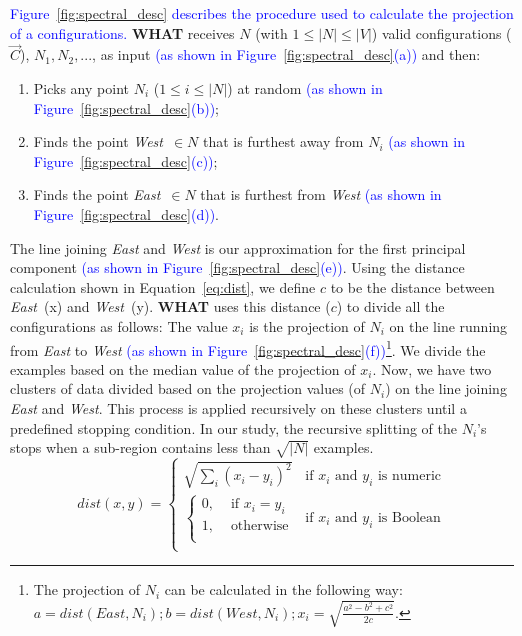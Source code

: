 \documentclass[smallextended]{svjour3}       %
\newcommand{\what}{{\bf WHAT}\xspace}
\begin{document}
\textcolor{blue}{Figure~\ref{fig:spectral_desc} describes the procedure used to calculate the projection of a configurations.} \what receives $N$ (with $1\leq \left\vert{N}\right\vert\leq \left\vert{V}\right\vert$)
valid configurations ($\vec{C}$), $N_1,N_2,...$, as input \textcolor{blue}{(as shown in Figure~\ref{fig:spectral_desc}(a))} and then:
\begin{enumerate}
\item
Picks any
point $N_i$ ($1\leq i \leq\left\vert{N}\right\vert$) at random \textcolor{blue}{(as shown in Figure~\ref{fig:spectral_desc}(b))};
\item
Finds
 the point  {\em West}~$\in N$ that is
furthest away from $N_i$ \textcolor{blue}{(as shown in Figure~\ref{fig:spectral_desc}(c))};
\item Finds the point {\em East}~$\in N$
that is furthest from {\em West} \textcolor{blue}{(as shown in Figure~\ref{fig:spectral_desc}(d))}.
\end{enumerate}
The line joining {\em East}
and {\em West} is our approximation for the first principal component \textcolor{blue}{(as shown in Figure~\ref{fig:spectral_desc}(e))}.
Using the distance calculation shown in Equation~\ref{eq:dist}, 
we define $\mathit{c}$ to be the distance between {\em East}~(x)
and {\em West}~(y). 
\what uses this distance ($\mathit{c}$) to divide all the configurations as follows:
The value $x_i$ is the projection of $N_i$
on the line  running  from {\em East} to {\em West} \textcolor{blue}{(as shown in Figure~\ref{fig:spectral_desc}(f))}\footnote{The projection of $N_i$ can be calculated in the following way:\newline $a = \mathit{dist}(\mathit{East}, N_i); b = \mathit{dist}(\mathit{West}, N_i);  x_i = \sqrt{\frac{a^2 - b^2 + \mathit{c}^2}{2\mathit{c}}}$.
}.  We divide
the examples based on the median value of the projection of $x_i$. Now, we have two clusters of data divided based on the projection values (of $N_i$) on the line joining {\em East} and {\em West}. This process is applied recursively on these clusters until a predefined stopping condition. In our study, the  recursive splitting of the $N_i$'s stops when a sub-region
contains less than  $\sqrt{|N|}$ examples.
\begin{equation}
    \mathit{dist}(x, y) =     
    \begin{cases}
      \sqrt{\sum_i(x_i-y_i)^2}
      & \text{if $x_i$ and $y_i$ is numeric}\\
        \begin{cases}
            0, & \text{ if $x_i = y_i$}\\
            1, & \text{ otherwise}\\
        \end{cases}
        & \text{if $x_i$ and $y_i$ is Boolean}\\
    \end{cases}
    \label{eq:dist}
\end{equation}
\end{document}
